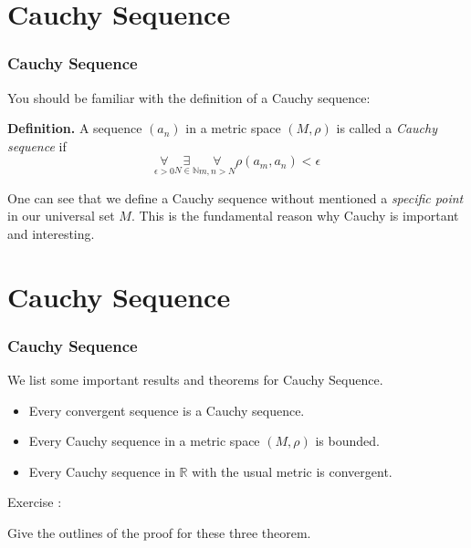\documentclass[12pt, t]{beamer}
\renewcommand{\emph}[1]{{\color{Turquoise3}\textsl{#1}}}
\begin{document}
\section{Cauchy Sequence}
\begin{frame}
    \frametitle{Cauchy Sequence}

    You should be familiar with the definition of a Cauchy sequence:
    \vspace{1em}

    \textbf{Definition.} A sequence $(a_n)$ in a metric space $(M,\rho)$ is called a \emph{Cauchy sequence} if
    \begin{equation*}
        \underset{\epsilon>0}{\forall}\underset{N\in\mathbb{N}}{\exists}\underset{m,n>N}{\forall}\rho(a_m,a_n)<\epsilon
    \end{equation*}

    One can see that we define a Cauchy sequence without mentioned a \emph{specific point} in our universal set $M$. This is the fundamental reason why Cauchy is important and
    interesting.

\end{frame}


\section{Cauchy Sequence}
\begin{frame}
    \frametitle{Cauchy Sequence}
    We list some important results and theorems for Cauchy Sequence.
    \begin{itemize}
        \item Every convergent sequence is a Cauchy sequence.
        \item Every Cauchy sequence in a metric space $(M,\rho)$ is bounded.
        \item Every Cauchy sequence in $\mathbb{R}$ with the usual metric is convergent.
    \end{itemize}

    \vspace{1em}

    Exercise : \\
    \begin{center}
        Give the outlines of the proof for these three theorem.
    \end{center}

\end{frame}
\end{document}
